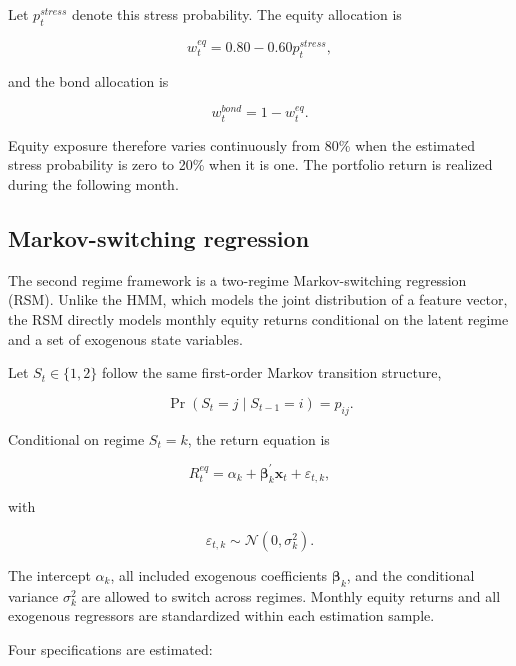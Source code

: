 Let $p_t^{stress}$ denote this stress probability. The equity allocation is

\begin{equation}
w_t^{eq}
=
0.80
-
0.60
p_t^{stress},
\end{equation}

and the bond allocation is

\begin{equation}
w_t^{bond}
=
1
-
w_t^{eq}.
\end{equation}

Equity exposure therefore varies continuously from 80\% when the estimated stress probability
is zero to 20\% when it is one. The portfolio return is realized during the following month.

\subsection{Markov-switching regression}

The second regime framework is a two-regime Markov-switching regression (RSM). Unlike the
HMM, which models the joint distribution of a feature vector, the RSM directly models monthly
equity returns conditional on the latent regime and a set of exogenous state variables.

Let $S_t\in\{1,2\}$ follow the same first-order Markov transition structure,

\begin{equation}
\Pr(S_t=j\mid S_{t-1}=i)
=
p_{ij}.
\end{equation}

Conditional on regime $S_t=k$, the return equation is

\begin{equation}
R_t^{eq}
=
\alpha_k
+
\boldsymbol{\beta}_k^{\prime}
\mathbf{x}_t
+
\varepsilon_{t,k},
\end{equation}

with

\begin{equation}
\varepsilon_{t,k}
\sim
\mathcal{N}
\left(
0,
\sigma_k^2
\right).
\end{equation}

The intercept $\alpha_k$, all included exogenous coefficients
$\boldsymbol{\beta}_k$, and the conditional variance $\sigma_k^2$ are allowed to switch across
regimes. Monthly equity returns and all exogenous regressors are standardized within each
estimation sample.

Four specifications are estimated:

